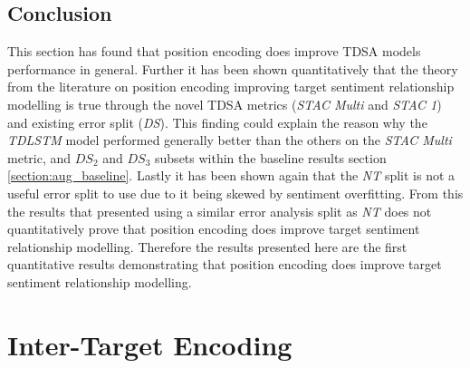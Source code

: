 \subsection{Conclusion}
This section has found that position encoding does improve TDSA models performance in general. Further it has been shown quantitatively that the theory from the literature on position encoding improving target sentiment relationship modelling \citep{li-etal-2018-hierarchical, he-etal-2018-exploiting} is true through the novel TDSA metrics (\textit{STAC Multi} and \textit{STAC 1}) and existing error split (\textit{DS}). This finding could explain the reason why the \textit{TDLSTM} model performed generally better than the others on the \textit{STAC Multi} metric, and $DS_2$ and $DS_3$ subsets within the baseline results section \ref{section:aug_baseline}. Lastly it has been shown again that the \textit{NT} split is not a useful error split to use due to it being skewed by sentiment overfitting. From this the results that \citet{he-etal-2018-exploiting} presented using a similar error analysis split as \textit{NT} does not quantitatively prove that position encoding does improve target sentiment relationship modelling. Therefore the results presented here are the first quantitative results demonstrating that position encoding does improve target sentiment relationship modelling.

\section{Inter-Target Encoding}
